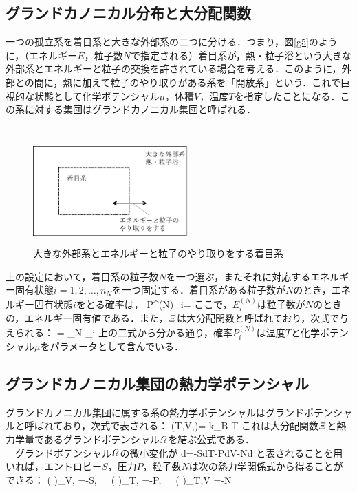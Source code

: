 \subsection{グランドカノニカル分布と大分配関数}
一つの孤立系を着目系と大きな外部系の二つに分ける．つまり，図\ref{g5}のように，（エネルギー$E$，粒子数$N$で指定される）着目系が，熱・粒子浴という大きな外部系とエネルギーと粒子の交換を許されている場合を考える．このように，外部との間に，熱に加えて粒子のやり取りがある系を「開放系」という．これで巨視的な状態として化学ポテンシャル$\mu$，体積$V$，温度$T$を指定したことになる．この系に対する集団はグランドカノニカル集団と呼ばれる．\\
%
　\begin{figure}[H]
 \centering
\includegraphics[width=6cm,height=4cm]{file/basic_st/fig/bo6.png}
  \caption{大きな外部系とエネルギーと粒子のやり取りをする着目系}
  \label{g6}
\end{figure}




上の設定において，着目系の粒子数$N$を一つ選ぶ，またそれに対応するエネルギー固有状態$i=1,2,\ldots,n_N$を一つ固定する．着目系がある粒子数が$N$のとき，エネルギー固有状態$i$をとる確率は，
\be
P^{(N)}_i=\exp{}
\ee
ここで，$E_i^{(N)}$は粒子数が$N$のときの，エネルギー固有値である．また，${\it{\Xi}}$は大分配関数と呼ばれており，次式で与えられる：
\be
{\it{\Xi}}=
\displaystyle\sum_N
\displaystyle\sum_i
\exp{}
\ee
上の二式から分かる通り，確率$P^{(N)}_i$は温度$T$と化学ポテンシャル$\mu$をパラメータとして含んでいる．



%
\subsection{グランドカノニカル集団の熱力学ポテンシャル}
グランドカノニカル集団に属する系の熱力学ポテンシャルはグランドポテンシャルと呼ばれており，次式で表される：
\be
{\it\Omega}(T,V,\mu)=-k_{\rm{B}} T\ln{{\it{\Xi}}}
\ee
これは大分配関数${\it{\Xi}}$と熱力学量であるグランドポテンシャル${\it\Omega}$を結ぶ公式である．\\
　グランドポテンシャル${\it\Omega}$の微小変化が
\be
d{\it\Omega}=-SdT-PdV-Nd\mu
\ee
と表されることを用いれば，エントロピー$S$，圧力$P$，粒子数$N$は次の熱力学関係式から得ることができる：
\be
\left(
\right)_{V,\mu}
=-S,\ \ \ 
\left(
\right)_{T,\mu}
=-P,\ \ \ 
\left(
\frac{\partial{\it\Omega}}{\partial \mu}
\right)_{T,V}
=-N
\ee


